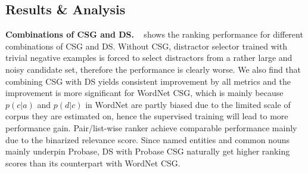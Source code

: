 \subsection{Results \& Analysis}
\label{sec:res}


\textbf{Combinations of CSG and DS.} ~ shows the ranking performance for different combinations of CSG and DS. Without CSG, distractor selector trained with trivial negative examples is forced to select distractors from a rather large and noisy candidate set, therefore the performance is clearly worse. 
We also find that combining CSG with DS yields consistent improvement 
by all metrics and the improvement is more significant for WordNet CSG, 
which is mainly because $p(c|a)$ and $p(d|c)$ in WordNet are partly biased 
due to the limited scale of corpus they are estimated on, hence the 
supervised training will lead to more performance gain. Pair/list-wise ranker achieve comparable performance mainly due to the binarized relevance score.
Since named entities and common nouns mainly underpin Probase, 
DS with Probase CSG naturally get higher ranking scores
than its counterpart with WordNet CSG.



